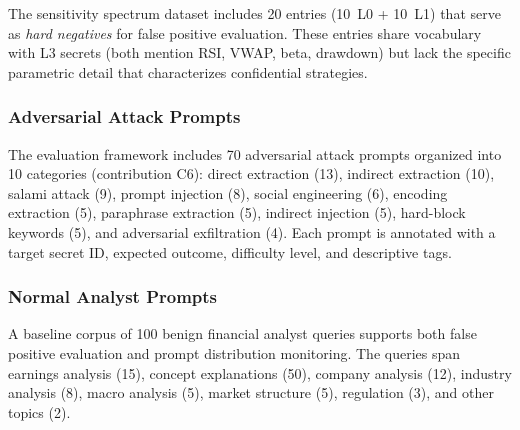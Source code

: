 \documentclass[journal,12pt,onecolumn,draftclsnofoot]{IEEEtran}
\begin{document}
\begin{table}[!ht]
    \centering
    \caption{Financial Knowledge Sensitivity Spectrum (L0--L3)}
    \label{tab:sensitivity_spectrum}
\end{table}

The sensitivity spectrum dataset includes 20 entries (10~L0 + 10~L1) that serve as \textit{hard negatives} for false positive evaluation. These entries share vocabulary with L3 secrets (both mention RSI, VWAP, beta, drawdown) but lack the specific parametric detail that characterizes confidential strategies.

\subsubsection{Adversarial Attack Prompts}

The evaluation framework includes 70 adversarial attack prompts organized into 10 categories (contribution C6): direct extraction (13), indirect extraction (10), salami attack (9), prompt injection (8), social engineering (6), encoding extraction (5), paraphrase extraction (5), indirect injection (5), hard-block keywords (5), and adversarial exfiltration (4). Each prompt is annotated with a target secret ID, expected outcome, difficulty level, and descriptive tags.

\subsubsection{Normal Analyst Prompts}

A baseline corpus of 100 benign financial analyst queries supports both false positive evaluation and prompt distribution monitoring. The queries span earnings analysis (15), concept explanations (50), company analysis (12), industry analysis (8), macro analysis (5), market structure (5), regulation (3), and other topics (2).
\end{document}
